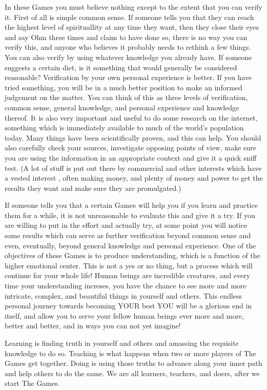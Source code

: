 \documentclass[12pt,letterpaper]{book}
\begin{document}
In these Games you must believe nothing except to the extent that you can verify it. First of all is simple common sense. If someone tells you that they can reach the highest level of spirituallity at any time they want, then they close their eyes and say Ohm three times and claim to have done so, there is no way you can verify this, and anyone who believes it probably needs to rethink a few things. You can also verify by using whatever knowledge you already have. If someone suggests a certain diet, is it something that would generally be considered reasonable? Verification by your own personal experience is better. If you have tried something, you will be in a much better position to make an informed judgement on the matter. You can think of this as three levels of verification, common sense, general knowledge, and personal experience and knowledge thereof. It is also very important and useful to do some research on the internet, something which is immediately available to much of the world's population today. Many things have been scientifically proven, and this can help. You should also carefully check your sources, investigate opposing points of view, make sure you are using the information in an appropriate context and give it a quick sniff test. (A lot of stuff is put out there by commercial and other interests which have a vested interest , often making money, and plenty of money and power to get the results they want and make sure they are promulgated.)

If someone tells you that a certain Games will help you if you learn and practice them for a while, it is not unreasonable to evaluate this and give it a try. If you are willing to put in the effort and actually try, at some point you will notice some results which can serve as further verification beyond common sense and even, eventually, beyond general knowledge and personal experience. One of the objectives of these Games is to produce understanding, which is a function of the higher emotional center. This is not a yes or no thing, but a process which will continue for your whole life! Human beings are incredible creatures, and every time your understanding increses, you have the chance to see more and more intricate, complex, and beautiful things in yourself and others. This endless personal journey towards becoming YOUR best YOU will be a glorious end in itself, and allow you to serve your fellow human beings ever more and more, better and better, and in ways you can not yet imagine!

Learning is finding truth in yourself and others and amassing the requisite knowledge to do so. Teaching is what happens when two or more players of The Games get together. Doing is using those truths to advance along your inner path and help others to do the same. We are all learners, teachers, and doers, after we start The Games.
\end{document}
